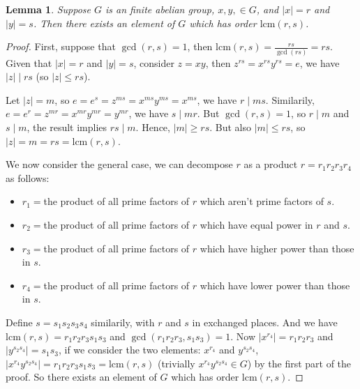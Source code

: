 \documentclass[12pt]{article}
\title{\mytitle}
\author{\myauthor}
\date{}
\newtheorem{lemma}[theorem]{Lemma}
\theoremstyle{definition}
\theoremstyle{remark}
\begin{document}
\maketitle

\section{}
\begin{lemma}
Suppose $G$ is an finite abelian group, $x,y,\in G$, and $|x|=r$ and $|y|=s$. Then there exists an element of $G$ which has order $\mathrm{lcm}(r,s)$.
\end{lemma}
\begin{proof}
First, suppose that $\gcd{(r,s)}=1$, then $\mathrm{lcm}(r,s)=\frac{rs}{\gcd{(rs)}}=rs$. Given that $|x|=r$ and $|y|=s$, consider $z=xy$, then $z^{rs}=x^{rs}y^{rs}=e$, we have $|z|\mid rs$ (so $|z|\le rs$). 

Let $|z|=m$, so $e=e^s=z^{ms}=x^{ms}y^{ms}=x^{ms}$, we have $r\mid ms$. Similarily, $e=e^r=z^{mr}=x^{mr}y^{mr}=y^{mr}$, we have $s\mid mr$. But $\gcd{(r,s)}=1$, so $r\mid m$ and $s\mid m$, the result implies $rs\mid m$. Hence, $|m|\ge rs$. But also $|m|\le rs$, so $|z|=m=rs=\mathrm{lcm}(r,s)$.

We now consider the general case, we can decompose $r$ as a product $r=r_1r_2r_3r_4$ as follows:

\begin{itemize}
    \item $r_1=$the product of all prime factors of $r$ which aren't prime factors of $s$.
    \item $r_2=$the product of all prime factors of $r$ which have equal power in $r$ and $s$.
    \item $r_3=$the product of all prime factors of $r$ which have higher power than those in $s$.
    \item $r_4=$the product of all prime factors of $r$ which have lower power than those in $s$.
\end{itemize}
Define $s=s_1s_2s_3s_4$ similarily, with $r$ and $s$ in exchanged places. And we have $\mathrm{lcm}(r,s)=r_1r_2r_3s_1s_3$ and $\gcd{(r_1r_2r_3, s_1s_3)}=1$. Now $|x^{r_4}|=r_1r_2r_3$ and $|y^{s_2s_4}|=s_1s_3$, if we consider the two elements: $x^{r_4}$ and $y^{s_2s_4}$, $|x^{r_4}y^{s_2s_4}|=r_1r_2r_3s_1s_3=\mathrm{lcm}(r,s)$ (trivially $x^{r_4}y^{s_2s_4}\in G$) by the first part of the proof. So there exists an element of $G$ which has order $\mathrm{lcm}(r,s)$.
\end{proof}
\end{document}

